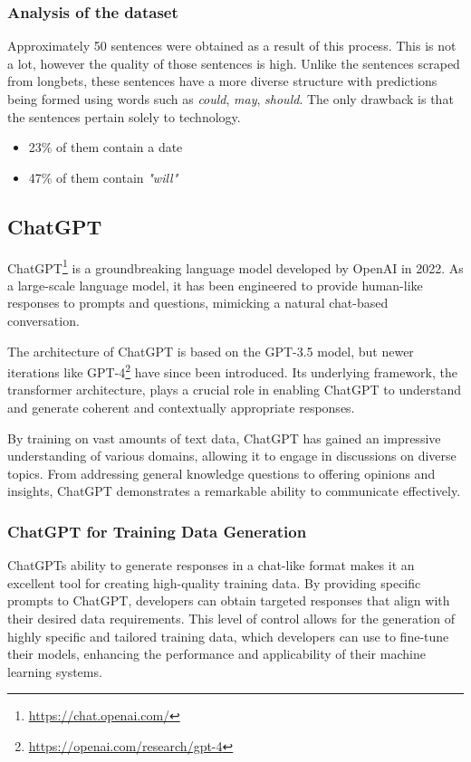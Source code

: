\documentclass[a4paper,10pt]{report} %
\begin{document}
\subsubsection{Analysis of the dataset}
Approximately 50 sentences were obtained as a result of this process. This is not a lot, however the quality of those sentences is high. Unlike the sentences scraped from longbets, these sentences have a more diverse structure with predictions being formed using words such as \textit{could}, \textit{may}, \textit{should}. The only drawback is that the sentences pertain solely to technology.

\begin{itemize}
  \item 23\% of them contain a date
  \item 47\% of them contain \textit{"will"}
\end{itemize}


\subsection{ChatGPT} %
ChatGPT\footnote{\url{https://chat.openai.com/}} is a groundbreaking language model developed by OpenAI in 2022. As a large-scale language model, it has been engineered to provide human-like responses to prompts and questions, mimicking a natural chat-based conversation. 

The architecture of ChatGPT is based on the GPT-3.5 model, but newer iterations like GPT-4\footnote{\url{https://openai.com/research/gpt-4}} have since been introduced. Its underlying framework, the transformer architecture, plays a crucial role in enabling ChatGPT to understand and generate coherent and contextually appropriate responses.

By training on vast amounts of text data, ChatGPT has gained an impressive understanding of various domains, allowing it to engage in discussions on diverse topics. From addressing general knowledge questions to offering opinions and insights, ChatGPT demonstrates a remarkable ability to communicate effectively. \cite{OpenAIChatGPT}

\subsubsection{ChatGPT for Training Data Generation}
ChatGPTs ability to generate responses in a chat-like format makes it an excellent tool for creating high-quality training data. By providing specific prompts to ChatGPT, developers can obtain targeted responses that align with their desired data requirements. This level of control allows for the generation of highly specific and tailored training data, which developers can use to fine-tune their models, enhancing the performance and applicability of their machine learning systems.
\end{document}
